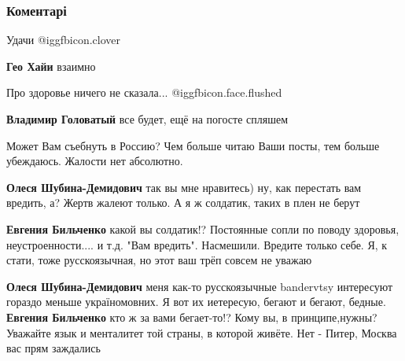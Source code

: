  
 
 
 
 
\subsubsection{Коментарі}
\label{sec:28_09_2021.fb.bilchenko_evgenia.1.ne_zabyli_svoboda.cmt}

\begin{itemize} %
Удачи  @igg{fbicon.clover} 

\begin{itemize} %
\textbf{Гео Хайи} взаимно
\end{itemize} %

Про здоровье ничего не сказала... @igg{fbicon.face.flushed} 

\begin{itemize} %
\textbf{Владимир Головатый} все будет, ещё на погосте спляшем
\end{itemize} %

Может Вам съебнуть в Россию? Чем больше читаю Ваши посты, тем больше убеждаюсь. Жалости нет абсолютно.

\begin{itemize} %
\textbf{Олеся Шубина-Демидович} так вы мне нравитесь) ну, как перестать вам вредить, а? Жертв жалеют только. А я ж солдатик, таких в плен не берут

\textbf{Евгения Бильченко} какой вы солдатик!? Постоянные сопли по поводу здоровья, неустроенности.... и т.д. "Вам вредить". Насмешили. Вредите только себе. Я, к стати, тоже русскоязычная, но этот ваш трёп совсем не уважаю

\textbf{Олеся Шубина-Демидович} меня как-то русскоязычные bandervtsy интересуют гораздо меньше україномовних. Я вот их иетересую, бегают и бегают, бедные.
\textbf{Евгения Бильченко} кто ж за вами бегает-то!? Кому вы, в принципе,нужны? Уважайте язык и менталитет той страны, в которой живёте. Нет - Питер, Москва вас прям заждались


\end{itemize}
\end{itemize}
